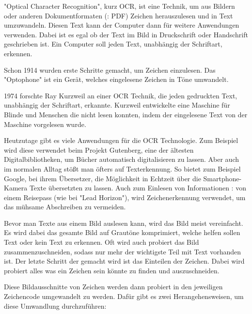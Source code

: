 \label{sec:ocr}


"Optical Character Recognition", kurz OCR, ist eine Technik, um aus Bildern oder anderen Dokumentformaten (\zb: PDF) Zeichen herauszulesen und in Text umzuwandeln. Diesen Text kann der Computer dann für weitere Anwendungen verwenden. Dabei ist es egal ob der Text im Bild in Druckschrift oder Handschrift geschrieben ist. Ein Computer soll jeden Text, unabhängig der Schriftart, erkennen.
\cite{OCRIntro}


Schon 1914 wurden erste Schritte gemacht, um Zeichen einzulesen. Das "Optophone" ist ein Gerät, welches eingelesene Zeichen in Töne umwandelt.\cite{OCRRecognition}

1974 forschte Ray Kurzweil an einer OCR Technik, die jeden gedruckten Text, unabhängig der Schriftart, erkannte. Kurzweil entwickelte eine Maschine für Blinde und Menschen die nicht lesen konnten, indem der eingelesene Text von der Maschine vorgelesen wurde.\cite{OCRRecognition}

Heutzutage gibt es viele Anwendungen für die OCR Technologie. Zum Beispiel wird diese verwendet beim Projekt Gutenberg, eine der ältesten Digitalbibliotheken, um Bücher automatisch digitalisieren zu lassen. Aber auch im normalen Alltag stößt man öfters auf Texterkennung. So bietet zum Beispiel Google, bei ihrem Übersetzer, die Möglichkeit in Echtzeit über die Smartphone-Kamera Texte übersetzten zu lassen. Auch zum Einlesen von Informationen \zb: von einem Reisepass (wie bei "Lead Horizon"), wird Zeichenerkennung verwendet, um das mühsame Abschreiben zu vermeiden.


Bevor man Texte aus einem Bild auslesen kann, wird das Bild meist vereinfacht. Es wird dabei das gesamte Bild auf Grautöne komprimiert, welche helfen sollen Text oder kein Text zu erkennen. Oft wird auch probiert das Bild zusammenzuschneiden, sodass nur mehr der wichtigste Teil mit Text vorhanden ist. Der letzte Schritt der gemacht wird ist das Einteilen der Zeichen. Dabei wird probiert alles was ein Zeichen sein könnte zu finden und auszuschneiden.\cite{OCRPreProcessing}

Diese Bildausschnitte von Zeichen werden dann probiert in den jeweiligen Zeichencode umgewandelt zu werden. Dafür gibt es zwei Herangehensweisen, um diese Umwandlung durchzuführen:

